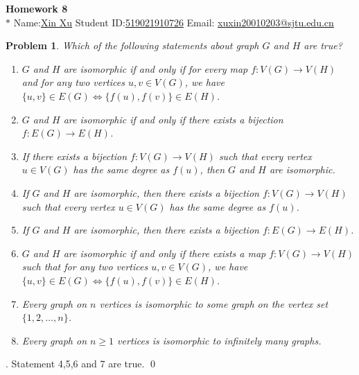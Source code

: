 \documentclass[12pt]{article}
\date{Feb 14, 2012}
\newtheorem{hw}{Problem}
\newenvironment{sol}
  {\par\vspace{3mm}\noindent{\it Solution}.}
  {\qed}
\begin{document}
\begin{center}
{\LARGE\bf Homework 8}\\
\vspace{2mm}
\footnotesize{$*$ Name:\underline{Xin Xu}  \quad Student ID:\underline{519021910726} \quad Email: \underline{xuxin20010203@sjtu.edu.cn}}
\vspace{2mm}
\end{center}

\begin{hw}
  Which of the following statements about graph $G$ and $H$ are true?
  \begin{enumerate}
    \item $G$ and $H$ are isomorphic if and only if for every map $f:V(G)\rightarrow V(H)$ and for any two vertices $u,v\in V(G)$, we have $\{u,v\}\in E(G)\Leftrightarrow \{f(u),f(v)\}\in E(H)$.
    \item $G$ and $H$ are isomorphic if and only if there exists a bijection $f: E(G)\rightarrow E(H)$.
    \item If there exists a bijection $f:V(G)\rightarrow V(H)$ such that every vertex $u\in V(G)$ has the same degree as $f(u)$, then $G$ and $H$ are isomorphic.
    \item If $G$ and $H$ are isomorphic, then there exists a bijection $f:V(G)\rightarrow V(H)$ such that every vertex $u\in V(G) $ has the same degree as $f(u)$.
    \item If $G$ and $H$ are isomorphic, then there exists a bijection $f: E(G)\rightarrow E(H)$.
    \item $G$ and $H$ are isomorphic if and only if there exists a map $f:V(G)\rightarrow V(H)$ such that for any two vertices $u,v\in V(G)$, we have $\{u,v\}\in E(G)\Leftrightarrow \{f(u),f(v)\}\in E(H)$.
    \item Every graph on $n$ vertices is isomorphic to some graph on the vertex set $\{1,2,\ldots, n\}$.
    \item Every graph on $n\geq 1$ vertices is isomorphic to infinitely many graphs.
  \end{enumerate}
\end{hw}

\begin{sol}
    Statement 4,5,6 and 7 are true.
\end{sol}
\end{document}
